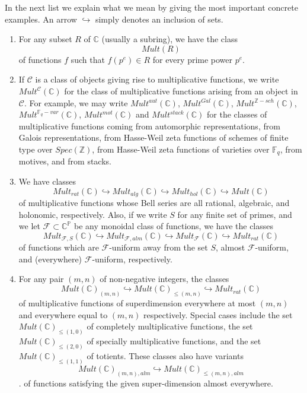 \documentclass[a4paper]{article}
\theoremstyle{definition}
\theoremstyle{remark}
\newcommand{\Z}{\mathbb{Z}}
\newcommand{\C}{\mathbb{C}}
\begin{document}
In the next list we explain what we mean by giving the most important concrete examples. An arrow $\hookrightarrow$ simply denotes an inclusion of sets.

\begin{enumerate}
\item For any subset $R$ of $\C$ (usually a subring), we have the class
$$Mult(R)$$ 
of functions $f$ such that $f(p^e) \in R$ for every prime power $p^e$. 
\item If $\mathcal{C}$ is a class of objects giving rise to multiplicative functions, we write $Mult^{\mathcal{C}}(\C)$ for the class of multiplicative functions arising from an object in $\mathcal{C}$. For example, we may write $Mult^{aut}(\C)$, $Mult^{Gal}(\C)$, $Mult^{\Z-sch}(\C)$, $Mult^{\mathbb{F}_q-var}(\C)$, $Mult^{mot}(\C)$ and $Mult^{stack}(\C)$ for the classes of multiplicative functions coming from automorphic representations, from Galois representations, from Hasse-Weil zeta functions of schemes of finite type over $Spec(\Z)$, from Hasse-Weil zeta functions of varieties over $\mathbb{F}_q$, from motives, and from stacks. 
\item We have classes 
$$Mult_{rat}(\C) \hookrightarrow Mult_{alg}(\C) \hookrightarrow Mult_{hol}(\C) \hookrightarrow Mult(\C) $$ 
of multiplicative functions whose Bell series are all rational, algebraic, and holonomic, respectively. Also, if we write $S$ for any finite set of primes, and we let $\mathcal{F} \subset \C^{\mathbb{P}}$ be any monoidal class of functions, we have the classes 
$$ Mult_{\mathcal{F}, S}(\C) \hookrightarrow Mult_{\mathcal{F}, alm}(\C) \hookrightarrow Mult_{\mathcal{F}}(\C)  \hookrightarrow Mult_{rat}(\C)   $$
of functions which are $\mathcal{F}$-uniform away from the set $S$, almost $\mathcal{F}$-uniform, and (everywhere) $\mathcal{F}$-uniform, respectively.
\item For any pair $(m, n)$ of non-negative integers, the classes
$$ Mult(\C)_{(m, n)} \hookrightarrow Mult(\C)_{\leq (m, n)}  \hookrightarrow Mult_{rat}(\C)$$
of multiplicative functions of superdimension everywhere at most $(m, n)$ and everywhere equal to $(m, n)$ respectively. Special cases include the set $Mult(\C)_{\leq (1, 0)}$ of completely multiplicative functions, the set $Mult(\C)_{\leq (2, 0)}$ of specially multiplicative functions, and the set $Mult(\C)_{\leq (1, 1)}$ of totients. These classes also have variants 
$$Mult(\C)_{(m, n), alm} \hookrightarrow Mult(\C)_{ \leq (m, n), alm}$$.
of functions satisfying the given super-dimension almost everywhere.


\end{enumerate}
\end{document}
